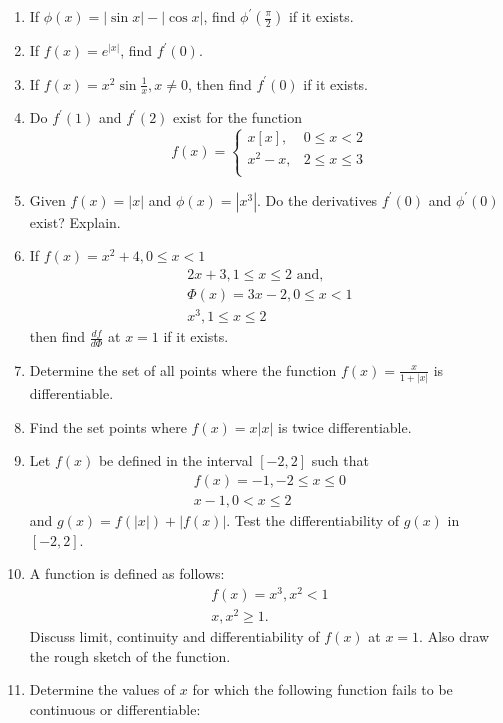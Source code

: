 \begin{enumerate}[start=1]
    \item If $\phi(x)=|\sin x|-|\cos x|$, find $\phi^{\prime}\left(\frac{\pi}{2}\right)$ if it exists.
    \item If $f(x)=e^{|x|}$, find $f^{\prime}(0)$.
    \item If $f(x)=x^2 \sin \frac{1}{x}, x \neq 0$, then find $f^{\prime}(0)$ if it exists.
    \item Do $f^{\prime}(1)$ and $f^{\prime}(2)$ exist for the function
    \[
    f(x)= 
    \begin{cases}
      x[x], & 0 \leq x<2 \\
      x^2-x, & 2 \leq x \leq 3 \\
    \end{cases}
    \]
    \item Given $f(x)=|x|$ and $\phi(x)=\left|x^3\right|$. Do the derivatives $f^{\prime}(0)$ and $\phi^{\prime}(0)$ exist? Explain.
    \item If $f(x)=x^2+4,0 \leq x<1$
    \[
    \begin{aligned}
    2 x+3,1 \leq x \leq 2 \text { and, } \\
    \Phi(x)=3 x-2,0 \leq x<1 \\
    x^3, 1 \leq x \leq 2
    \end{aligned}
    \]
    then find $\frac{d f}{d \Phi}$ at $x=1$ if it exists.
    \item Determine the set of all points where the function $f(x)=\frac{x}{1+|x|}$ is differentiable.
    \item Find the set points where $f(x)=x|x|$ is twice differentiable.
    \item Let $f(x)$ be defined in the interval $[-2,2]$ such that
    \[
    \begin{array}{r}
    f(x)=-1,-2 \leq x \leq 0 \\
    x-1,0<x \leq 2
    \end{array}
    \]
    and $g(x)=f(|x|)+|f(x)|$. Test the differentiability of $g(x)$ in $[-2,2]$.
    \item A function is defined as follows:
    \[
    \begin{array}{r}
    f(x)=x^3, x^2<1 \\
    x, x^2 \geq 1 .
    \end{array}
    \]
    Discuss limit, continuity and differentiability of $f(x)$ at $x=1$. Also draw the rough sketch of the function.
    \item Determine the values of $x$ for which the following function fails to be continuous or differentiable:

\end{enumerate}
